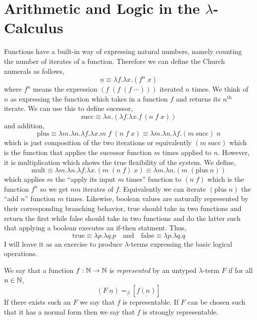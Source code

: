 \documentclass[12pt]{article}
\begin{document}
\section{Arithmetic and Logic in the $\lambda$-Calculus}

Functions have a built-in way of expressing natural numbers, namely counting the number of iterates of a function. Therefore we can define the Church numerals as follows,
\[ \underline{n} \equiv \lambda f . \lambda x . (f^n \; x) \]
where $f^n$ means the expression $(f \; (f \; (f \; \cdots)))$ iterated $n$ times. We think of $n$ as expressing the function which takes in a function $f$ and returns its $n^{\text{th}}$ iterate. We can use this to define sucessor,
\[ \text{succ} \equiv \lambda n . (\lambda f . \lambda x. f \, (n \; f \; x)) \]
and addition,
\[ \text{plus} \equiv \lambda m . \lambda n. \lambda f. \lambda x . m \; f \; (n \; f \; x) \equiv \lambda m . \lambda n . \lambda f . (m \; \text{succ}) \; n\]
which is just composition of the two iterations or equivalently $(m \; \text{succ})$ which is the function that applies the sucessor function $m$ times applied to $n$. However, it is multiplication which shows the true flexibility of the system. We define,
\[ \text{mult} \equiv \lambda m . \lambda n . \lambda f . \lambda x . (m \; (n \; f) \; x) \equiv \lambda m . \lambda n . (m \; (\text{plus} \; n)) \]
which applies $m$ the ``apply its input $m$ times'' function to $(n \; f)$ which is the function $f^n$ so we get $mn$ iterates of $f$. Equivalently we can iterate $(\text{plus} \; n)$ the ``add $n$'' function $m$ times. 
Likewise, boolean values are naturally represented by their corresponding branching behavior, true should take in two functions and return the first while false should take in two functions and do the latter such that applying a boolean executes an if-then statment. Thus,
\[ \text{true} \equiv \lambda p . \lambda q . p \quad \text{and} \quad \text{false} \equiv \lambda p . \lambda q . q \]
I will leave it as an exercise to produce $\lambda$-terms expressing the basic logical operations. 

\begin{defn}
We say that a function $f : \mathbb{N} \to \mathbb{N}$ is \textit{represented} by an untyped $\lambda$-term $F$ if for all $n \in \mathbb{N}$,
\[ (F \; \underline{n}) =_{\beta} [\underline{f(n)}] \]
If there exists such an $F$ we say that $f$ is representable. If $F$ can be chosen such that it has a normal form then we say that $f$ is strongly representable.
\end{defn}
\end{document}
